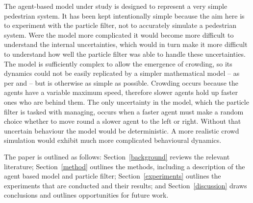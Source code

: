 The agent-based model under study is designed to represent a very simple pedestrian system. It has been kept intentionally simple because the aim here is to experiment with the particle filter, not to accurately simulate a pedestrian system. Were the model more complicated it would become more difficult to understand the internal uncertainties, which would in turn make it more difficult to understand how well the particle filter was able to handle these uncertainties. The model is sufficiently complex to allow the emergence of crowding, so its dynamics could not be easily replicated by a simpler mathematical model -- as per \citep{lloyd_exploring_2016} and \citep{ward_dynamic_2016} -- but is otherwise as simple as possible. Crowding occurs because the agents have a variable maximum speed, therefore slower agents hold up faster ones who are behind them. The only uncertainty in the model, which the particle filter is tasked with managing, occurs when a faster agent must make a random choice whether to move round a slower agent to the left or right. Without that uncertain behaviour the model would be deterministic. A more realistic crowd simulation \citep[e.g.][]{helbing_simulating_2000} would exhibit much more complicated behavioural dynamics.

The paper is outlined as follows: Section~\ref{background} reviews the relevant literature; Section~\ref{method} outlines the methods, including a description of the agent based model and particle filter; Section~\ref{experiments} outlines the experiments that are conducted and their results; and Section~\ref{discussion} draws conclusions and outlines opportunities for future work.
